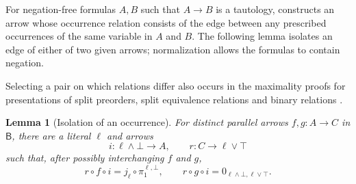 \documentclass[11pt]{article}
\newtheorem{lemma}[theorem]{Lemma}
\newcommand{\B}{\mathsf B}
\begin{document}
For negation-free formulas $A,B$ such that $A\to B$ is a
tautology, \cite[Lemma~6]{DPIsomorphic} constructs an arrow whose
occurrence relation consists of the edge between any prescribed
occurrences of the same variable in $A$ and $B$. The following
lemma isolates an edge of either of two given arrows; normalization
allows the formulas to contain negation.

Selecting a pair on which relations differ also occurs in the
maximality proofs for presentations of split preorders, split
equivalence relations and binary relations \cite[\S16]{DPSplit}.

\begin{lemma}[Isolation of an occurrence]\label{lem:isolation}
For distinct parallel arrows $f,g:A\to C$ in $\B$, there are a
literal $\ell$ and arrows
\[
 i:\ell\wedge\bot\longrightarrow A,
 \qquad r:C\longrightarrow\ell\vee\top
\]
such that, after possibly interchanging $f$ and $g$,
\[
 r\circ f\circ i=j_\ell\circ\pi_1^{\ell,\bot},
 \qquad
 r\circ g\circ i=0_{\ell\wedge\bot,\ell\vee\top}.
\]
\end{lemma}
\end{document}
